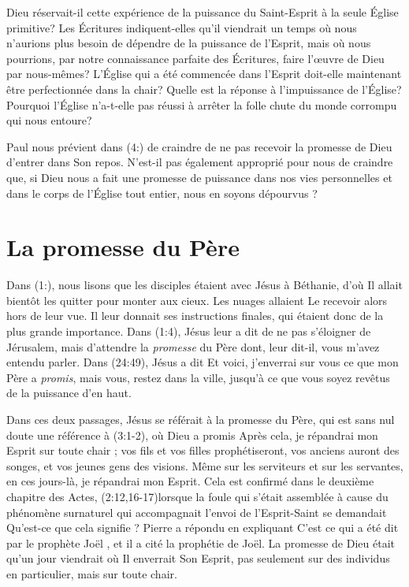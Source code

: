 Dieu réservait-il cette expérience de la puissance du Saint-Esprit à la seule
 Église primitive? Les Écritures indiquent-elles qu'il viendrait
 un temps où nous n'aurions plus besoin de dépendre de la puissance
 de l'Esprit, mais où nous pourrions, par notre connaissance parfaite
 des Écritures, faire l'œuvre de Dieu par nous-mêmes? L'Église qui a été
 commencée dans l'Esprit doit-elle maintenant être perfectionnée dans
 la chair?
 Quelle est la réponse à l'impuissance de l'Église?
 Pourquoi l'Église n'a-t-elle pas réussi à arrêter la folle chute
 du monde corrompu qui nous entoure?

Paul nous prévient dans (4:) de craindre de ne pas
 recevoir la promesse de Dieu d'entrer dans Son repos.
 N'est-il pas également approprié pour nous de craindre que, si Dieu
 nous a fait une promesse de puissance dans nos vies personnelles et
 dans le corps de l'Église tout entier, nous en soyons dépourvus ?


\section{La promesse du P\`ere}

Dans (1:), nous lisons que les disciples étaient avec
 Jésus à Béthanie, d'où Il allait bientôt les quitter pour monter
 aux cieux.
 Les nuages allaient Le recevoir alors hors de leur vue.
 Il leur donnait ses instructions finales, qui étaient donc de la plus
 grande importance.
 Dans (1:4), Jésus leur a dit de \Og ne pas s'éloigner
 de Jérusalem, mais d'attendre la \emph{promesse} du Père dont, leur dit-il,
 vous m'avez entendu parler. \Fg{}
 Dans (24:49), Jésus a dit\frcolon{}
 \Og Et voici, j'enverrai sur vous ce que mon Père a \emph{promis}, mais vous,
 restez dans la ville, jusqu'à ce que vous soyez revêtus de la puissance
 d'en haut.\Fg{}

Dans ces deux passages, Jésus se référait à la promesse du Père, qui est
 sans nul doute une référence à (3:1-2), où Dieu a promis\frcolon{}
 \Og Après cela, je répandrai mon Esprit sur toute chair ;
 vos fils et vos filles prophétiseront, vos anciens auront des songes,
 et vos jeunes gens des visions.
 Même sur les serviteurs et sur les servantes,
 en ces jours-là, je répandrai mon Esprit. \Fg{}
 Cela est confirmé dans le deuxième chapitre des Actes,
 (2:12,16-17)lorsque la foule qui
 s'était assemblée à cause du phénomène surnaturel qui accompagnait l'envoi
 de l'Esprit-Saint se demandait\frcolon{}
 \Og Qu'est-ce que cela signifie ? \Fg{}
 Pierre a répondu en expliquant\frcolon{}
 \Og C'est ce qui a été dit par le prophète Joël \Fg{},
 et il a cité la prophétie de Joël.
 La promesse de Dieu était qu'un jour viendrait où Il enverrait Son Esprit,
 pas seulement sur des individus en particulier, mais sur toute chair.

